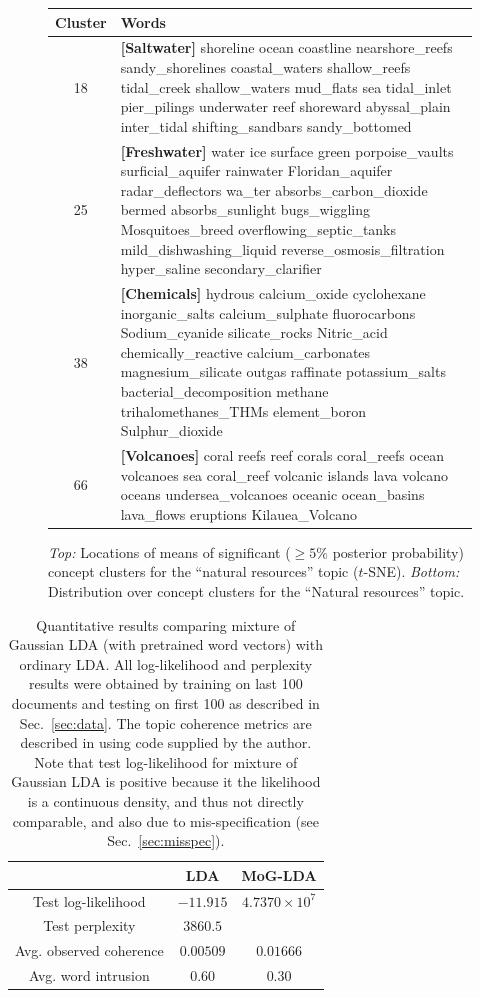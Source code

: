 \documentclass[11pt]{article}
\begin{document}
\begin{figure}
\begin{tabularx}{\columnwidth}{|c|X|}
\hline 
{\tiny{}Cluster} & {\tiny{}Words}\tabularnewline
\hline 
{\tiny{}18} & {\tiny{}\textbf{[Saltwater]} shoreline ocean coastline nearshore\_reefs sandy\_shorelines
coastal\_waters shallow\_reefs tidal\_creek shallow\_waters mud\_flats
sea tidal\_inlet pier\_pilings underwater reef shoreward abyssal\_plain
inter\_tidal shifting\_sandbars sandy\_bottomed }\tabularnewline
\hline 
{\tiny{}25} & {\tiny{}\textbf{[Freshwater]} water ice surface green porpoise\_vaults surficial\_aquifer
rainwater Floridan\_aquifer radar\_deflectors wa\_ter absorbs\_carbon\_dioxide
bermed absorbs\_sunlight bugs\_wiggling Mosquitoes\_breed overflowing\_septic\_tanks
mild\_dishwashing\_liquid reverse\_osmosis\_filtration hyper\_saline
secondary\_clarifier }\tabularnewline
\hline 
{\tiny{}38} & {\tiny{}\textbf{[Chemicals]} hydrous calcium\_oxide cyclohexane inorganic\_salts calcium\_sulphate
fluorocarbons Sodium\_cyanide silicate\_rocks Nitric\_acid chemically\_reactive
calcium\_carbonates magnesium\_silicate outgas raffinate potassium\_salts
bacterial\_decomposition methane trihalomethanes\_THMs element\_boron
Sulphur\_dioxide }\tabularnewline
\hline 
{\tiny{}66} & {\tiny{}\textbf{[Volcanoes]} coral reefs reef corals coral\_reefs ocean volcanoes sea coral\_reef
volcanic islands lava volcano oceans undersea\_volcanoes oceanic ocean\_basins
lava\_flows eruptions Kilauea\_Volcano}\tabularnewline
\hline 
\end{tabularx}

\caption{\label{fig:gtm-nat-res} \emph{Top:} Locations of means of significant ($\geq 5\%$ posterior probability) concept clusters for the ``natural resources'' topic ($t$-SNE). \emph{Bottom:} Distribution over concept clusters for the ``Natural resources'' topic.}
\end{figure}

\begin{table}
\centering
\begin{tabular}{|c|c|c|}
\cline{2-3} 
\multicolumn{1}{c|}{} & LDA & MoG-LDA\tabularnewline
\hline 
Test log-likelihood & $-11.915$ & $4.7370 \times 10^7$ \tabularnewline
\hline 
Test perplexity & $3860.5$ & \tabularnewline
\hline 
Avg. observed coherence & $0.00509$ & $0.01666$ \tabularnewline
\hline 
Avg. word intrusion & $0.60$ & $0.30$ \tabularnewline
\hline 
\end{tabular}
\caption{\label{fig:quant} Quantitative results comparing mixture of Gaussian LDA (with pretrained word vectors) with ordinary LDA. All log-likelihood and perplexity results were obtained by training on last 100 documents and testing on first 100 as described in Sec.~\ref{sec:data}. The topic coherence metrics are described in \cite{Lau14} using code supplied by the author. Note that test log-likelihood for mixture of Gaussian LDA is positive because it the likelihood is a continuous density, and thus not directly comparable, and also due to mis-specification (see Sec.~\ref{sec:misspec}).}
\end{table}
\end{document}
